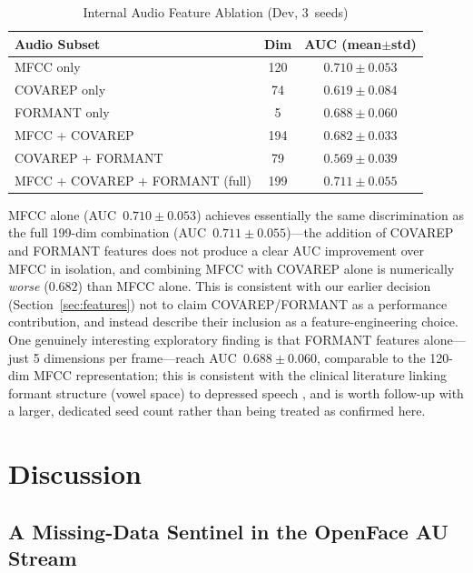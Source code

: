 \documentclass[journal]{IEEEtran}
\begin{document}
\begin{table}[t]
\centering
\renewcommand{\arraystretch}{1.15}
\caption{Internal Audio Feature Ablation (Dev, 3~seeds)}
\label{tab:audio_ablation}
\begin{tabular}{lcc}
\toprule
\textbf{Audio Subset} & \textbf{Dim} & \textbf{AUC (mean$\pm$std)} \\
\midrule
MFCC only                      & 120 & $0.710\pm0.053$ \\
COVAREP only                   &  74 & $0.619\pm0.084$ \\
FORMANT only                   &   5 & $0.688\pm0.060$ \\
MFCC + COVAREP                 & 194 & $0.682\pm0.033$ \\
COVAREP + FORMANT               &  79 & $0.569\pm0.039$ \\
MFCC + COVAREP + FORMANT (full) & 199 & $0.711\pm0.055$ \\
\bottomrule
\end{tabular}
\end{table}

MFCC alone (AUC~$0.710\pm0.053$) achieves essentially the same
discrimination as the full 199-dim combination
(AUC~$0.711\pm0.055$)---the addition of COVAREP and FORMANT features
does not produce a clear AUC improvement over MFCC in isolation, and
combining MFCC with COVAREP alone is numerically \emph{worse}
($0.682$) than MFCC alone. This is consistent with our earlier
decision (Section~\ref{sec:features}) not to claim COVAREP/FORMANT as
a performance contribution, and instead describe their inclusion as a
feature-engineering choice. One genuinely interesting exploratory
finding is that FORMANT features alone---just 5 dimensions per
frame---reach AUC~$0.688\pm0.060$, comparable to the 120-dim MFCC
representation; this is consistent with the clinical literature
linking formant structure (vowel space) to depressed speech
\cite{scherer2016vowel}, and is worth follow-up with a larger, dedicated
seed count rather than being treated as confirmed here.

\section{Discussion}
\label{sec:discussion}

\subsection{A Missing-Data Sentinel in the OpenFace AU Stream}
\label{sec:sentinel}
\end{document}
